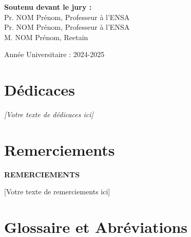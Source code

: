 \documentclass[12pt,a4paper]{report}
\begin{document}
\begin{titlepage}
\begin{center}
    \begin{center}
        \textbf{\textcolor{coverblue}{Soutenu devant le jury :}}\\[0.5cm]
        Pr. NOM Prénom, Professeur à l'ENSA\\[0.3cm]
        Pr. NOM Prénom, Professeur à l'ENSA\\[0.3cm]
        M. NOM Prénom, Reetain\\[0.3cm]
    \end{center}
    \vspace{0.8cm}
    
    {\normalsize Année Universitaire : 2024-2025}
\end{center}
\end{titlepage}

\chapter*{Dédicaces}
\begin{center}
    \vspace*{2cm}
    \itshape
    [Votre texte de dédicaces ici]
    \vspace*{2cm}
\end{center}
\clearpage

\chapter*{Remerciements}
\begin{center}
    \vspace*{1cm}
    \large\textbf{REMERCIEMENTS}
    \vspace*{1cm}
\end{center}

[Votre texte de remerciements ici]

\clearpage

\tableofcontents
\clearpage

\listoffigures
\clearpage

\listoftables
\clearpage

\chapter*{Glossaire et Abréviations}
\end{document}

